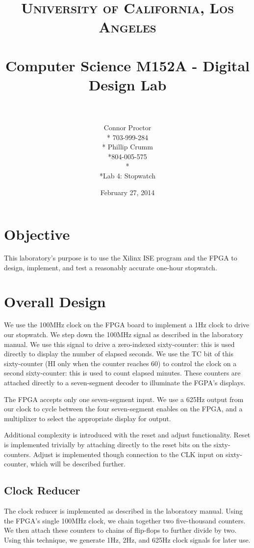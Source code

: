 \documentclass[paper=letter, fontsize=11pt]{scrartcl}
\title{	
\normalfont \normalsize 
\textsc{University of California, Los Angeles} \\ [25pt]
\horrule{0.5pt} \\[0.4cm]
\Large Computer Science M152A - Digital Design Lab \\
\horrule{2pt} \\[0.5cm]
}
\author{Connor Proctor \\* 703-999-284 \\* Phillip Crumm \\*804-005-575 \\* \\*Lab 4: Stopwatch}
\date{\normalsize February 27, 2014}
\begin{document}
\clearpage\maketitle
\thispagestyle{empty}
\pagebreak


\section{Objective}
This laboratory's purpose is to use the Xilinx ISE program and the FPGA to design, implement, and test a reasonably accurate one-hour stopwatch.

\section{Overall Design}
We use the 100MHz clock on the FPGA board to implement a 1Hz clock to drive our stopwatch. We step down the 100MHz signal as described in the laboratory manual. We use this signal to drive a zero-indexed sixty-counter: this is used directly to display the number of elapsed seconds. We use the TC bit of this sixty-counter (HI only when the counter reaches 60) to control the clock on a second sixty-counter: this is used to count elapsed minutes. These counters are attached directly to a seven-segment decoder to illuminate the FGPA's displays.

The FPGA accepts only one seven-segment input. We use a 625Hz output from our clock to cycle between the four seven-segment enables on the FPGA, and a multiplixer to select the appropriate display for output.

Additional complexity is introduced with the reset and adjust functionality. Reset is implemented trivially by attaching directly to the reset bits on the sixty-counters. Adjust is implemented though connection to the CLK input on sixty-counter, which will be described further.

\subsection{Clock Reducer}
The clock reducer is implemented as described in the laboratory manual. Using the FPGA's single 100MHz clock, we chain together two five-thousand counters. We then attach these counters to chains of flip-flops to further divide by two. Using this technique, we generate 1Hz, 2Hz, and 625Hz clock signals for later use.
\end{document}
